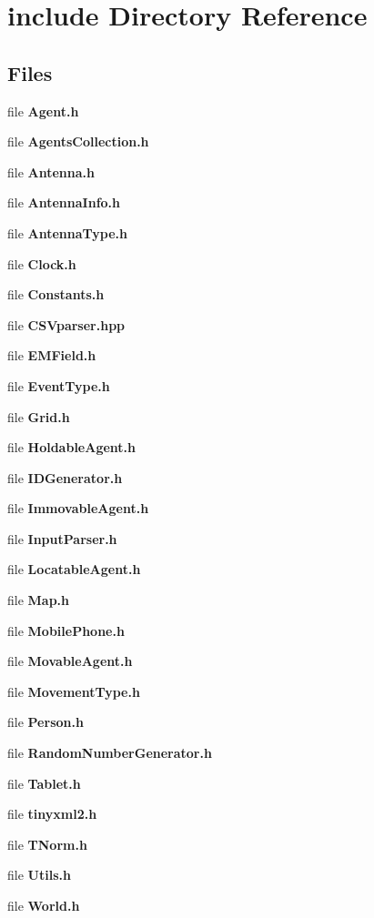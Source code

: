 \section{include Directory Reference}
\label{dir_d44c64559bbebec7f509842c48db8b23}
\subsection*{Files}
\begin{DoxyCompactItemize}
\item 
file \textbf{ Agent.\+h}
\item 
file \textbf{ Agents\+Collection.\+h}
\item 
file \textbf{ Antenna.\+h}
\item 
file \textbf{ Antenna\+Info.\+h}
\item 
file \textbf{ Antenna\+Type.\+h}
\item 
file \textbf{ Clock.\+h}
\item 
file \textbf{ Constants.\+h}
\item 
file \textbf{ C\+S\+Vparser.\+hpp}
\item 
file \textbf{ E\+M\+Field.\+h}
\item 
file \textbf{ Event\+Type.\+h}
\item 
file \textbf{ Grid.\+h}
\item 
file \textbf{ Holdable\+Agent.\+h}
\item 
file \textbf{ I\+D\+Generator.\+h}
\item 
file \textbf{ Immovable\+Agent.\+h}
\item 
file \textbf{ Input\+Parser.\+h}
\item 
file \textbf{ Locatable\+Agent.\+h}
\item 
file \textbf{ Map.\+h}
\item 
file \textbf{ Mobile\+Phone.\+h}
\item 
file \textbf{ Movable\+Agent.\+h}
\item 
file \textbf{ Movement\+Type.\+h}
\item 
file \textbf{ Person.\+h}
\item 
file \textbf{ Random\+Number\+Generator.\+h}
\item 
file \textbf{ Tablet.\+h}
\item 
file \textbf{ tinyxml2.\+h}
\item 
file \textbf{ T\+Norm.\+h}
\item 
file \textbf{ Utils.\+h}
\item 
file \textbf{ World.\+h}
\end{DoxyCompactItemize}
